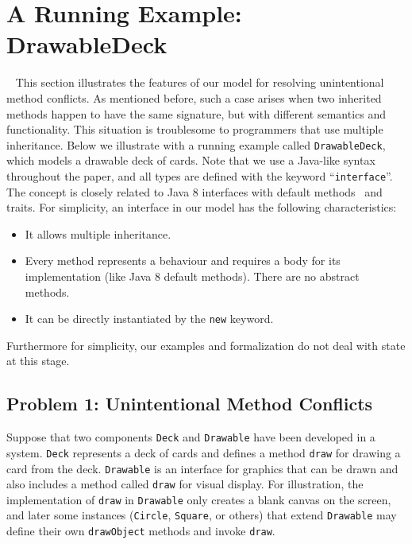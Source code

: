 \section{A Running Example: DrawableDeck}~\label{sec:overview}
This section illustrates the features of our model for
resolving unintentional method conflicts. As mentioned before, such a
case arises when two inherited methods happen to have the same
signature, but with different semantics and functionality. This
situation is troublesome to programmers that use multiple
inheritance. Below we illustrate with a running example called
\lstinline|DrawableDeck|, which models a drawable deck of cards. 
Note that we use a Java-like syntax
throughout the paper, and all types are defined with the keyword
``\lstinline|interface|''. The concept is closely related to Java 8
interfaces with default methods~\cite{bono14} and traits. For simplicity, an interface in our model has
the following characteristics:
\begin{itemize}
  \item It allows multiple inheritance.
  \item Every method represents a behaviour and requires a body for its implementation (like Java 8 default methods). There are no abstract methods.
  \item It can be directly instantiated by the \lstinline|new| keyword.
\end{itemize}
Furthermore for simplicity, our examples and formalization do not deal with state at
this stage. %

\subsection{Problem 1: Unintentional Method Conflicts}
Suppose that two components \lstinline|Deck| and \lstinline|Drawable| 
have been developed in a system. \lstinline|Deck| represents a deck
of cards and defines a method \lstinline|draw| for drawing a card from the
deck.  \lstinline|Drawable| is an interface for graphics that
can be drawn and also includes a method called \lstinline|draw| for
visual display. For illustration, the implementation of
\lstinline|draw| in \lstinline|Drawable| only creates a blank canvas
on the screen, and later some instances (\lstinline|Circle|,
\lstinline|Square|, or others) that extend \lstinline|Drawable| may
define their own \lstinline|drawObject| methods and invoke
\lstinline|draw|.

